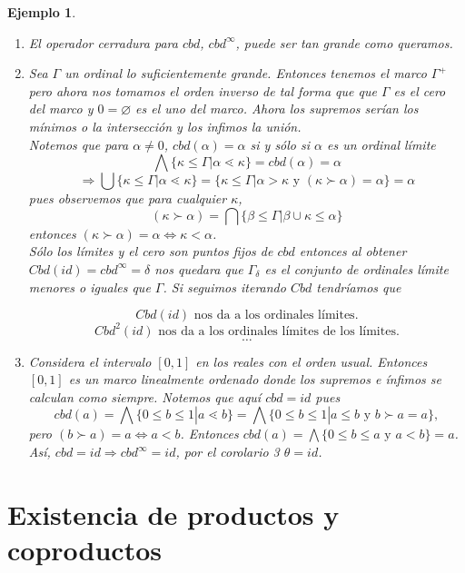 \documentclass[12pt,letterpaper,titlepage]{article}
\let\emptyset\varnothing
\newtheorem*{exa}{Ejemplo}
\theoremstyle{definition}
\newcommand\<{\langle}
\renewcommand\>{\rangle}
\begin{document}
\begin{exa}
\begin{enumerate}
\item El operador cerradura para $cbd$, $cbd^\infty$, puede ser tan grande como queramos.

\item Sea $\Gamma$ un ordinal lo suficientemente grande. Entonces tenemos el marco $\Gamma^+$ pero ahora nos tomamos el orden inverso de tal forma que que $\Gamma$ es el cero del marco y $0=\emptyset$ es el uno del marco. Ahora los supremos serían los mínimos o la intersección y los infimos la unión.\\
Notemos que para $\alpha\neq 0$, $cbd(\alpha)=\alpha$ si y sólo si $\alpha$ es un ordinal límite 
$$\bigwedge\{\kappa\leq\Gamma|\alpha\lessdot \kappa\}=cbd(\alpha)=\alpha$$
$$\Rightarrow \bigcup\{\kappa\leq \Gamma|\alpha\lessdot \kappa\}=\{\kappa\leq \Gamma|\alpha>\kappa\mbox{  y  }(\kappa\succ \alpha)=\alpha\}=\alpha$$
pues observemos que para cualquier $\kappa$,
$$(\kappa\succ \alpha)=\bigcap\{\beta\leq \Gamma|\beta\cup\kappa\leq \alpha\}$$
entonces $(\kappa\succ \alpha)=\alpha\Leftrightarrow \kappa<\alpha$.\\
Sólo los límites y el cero son puntos fijos de $cbd$ entonces al obtener $Cbd(id)=cbd^\infty=\delta$ nos quedara que $\Gamma_\delta$ es el conjunto de ordinales límite menores o iguales que $\Gamma$. Si seguimos iterando $Cbd$ tendríamos que 

$$Cbd(id)\mbox{  nos da a los ordinales límites}.$$
$$Cbd^2(id)\mbox{  nos da a los ordinales límites de los límites}.$$
$$\ldots$$
 
\item Considera el intervalo $[0,1]$ en los reales con el orden usual. Entonces $[0,1]$ es un marco linealmente ordenado donde los supremos e ínfimos se calculan como siempre. Notemos que aquí $cbd=id$ pues 
$$cbd(a)=\bigwedge\{0\leq b\leq 1|a\lessdot b\}=\bigwedge\{0\leq b\leq 1|a\leq b\mbox{  y  }b\succ a=a\}, $$
pero $(b\succ a)=a\Leftrightarrow a<b$. Entonces $cbd(a)=\bigwedge\{0\leq b\leq a\mbox{  y  }a<b\}=a$. Así, $cbd=id\Rightarrow cbd^\infty=id$, por el corolario 3 $\theta=id$. 

\end{enumerate}
\end{exa}

\section{Existencia de productos y coproductos}
\end{document}
